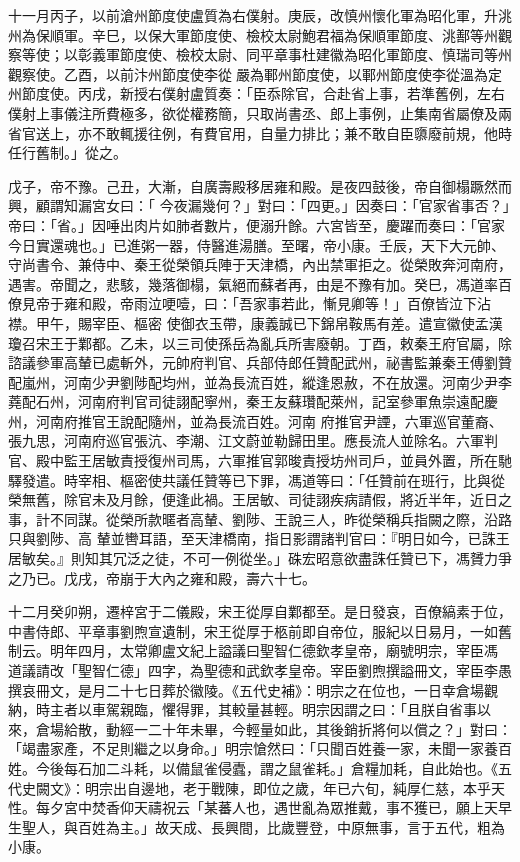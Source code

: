 \begin{pinyinscope}
 十一月丙子，以前滄州節度使盧質為右僕射。庚辰，改慎州懷化軍為昭化軍，升洮州為保順軍。辛巳，以保大軍節度使、檢校太尉鮑君福為保順軍節度、洮鄯等州觀察等使；以彰義軍節度使、檢校太尉、同平章事杜建徽為昭化軍節度、慎瑞司等州
 觀察使。乙酉，以前汴州節度使李從嚴為鄆州節度使，以鄆州節度使李從溫為定州節度使。丙戌，新授右僕射盧質奏：「臣忝除官，合赴省上事，若準舊例，左右僕射上事儀注所費極多，欲從權務簡，只取尚書丞、郎上事例，止集南省屬僚及兩省官送上，亦不敢輒援往例，有費官用，自量力排比；兼不敢自臣隳廢前規，他時任行舊制。」從之。



 戊子，帝不豫。己丑，大漸，自廣壽殿移居雍和殿。是夜四鼓後，帝自御榻蹶然而興，顧謂知漏宮女曰：「
 今夜漏幾何？」對曰：「四更。」因奏曰：「官家省事否？」帝曰：「省。」因唾出肉片如肺者數片，便溺升餘。六宮皆至，慶躍而奏曰：「官家今日實還魂也。」已進粥一器，侍醫進湯膳。至曙，帝小康。壬辰，天下大元帥、守尚書令、兼侍中、秦王從榮領兵陣于天津橋，內出禁軍拒之。從榮敗奔河南府，遇害。帝聞之，悲駭，幾落御榻，氣絕而蘇者再，由是不豫有加。癸巳，馮道率百僚見帝于雍和殿，帝雨泣哽噎，曰：「吾家事若此，慚見卿等！」百僚皆泣下沾襟。甲午，賜宰臣、樞密
 使御衣玉帶，康義誠已下錦帛鞍馬有差。遣宣徽使孟漢瓊召宋王于鄴都。乙未，以三司使孫岳為亂兵所害廢朝。丁酉，敕秦王府官屬，除諮議參軍高輦已處斬外，元帥府判官、兵部侍郎任贊配武州，祕書監兼秦王傅劉贊配嵐州，河南少尹劉陟配均州，並為長流百姓，縱逢恩赦，不在放還。河南少尹李蕘配石州，河南府判官司徒詡配寧州，秦王友蘇瓚配萊州，記室參軍魚崇遠配慶州，河南府推官王說配隨州，並為長流百姓。河南
 府推官尹諲，六軍巡官董裔、張九思，河南府巡官張沆、李潮、江文蔚並勒歸田里。應長流人並除名。六軍判官、殿中監王居敏責授復州司馬，六軍推官郭晙責授坊州司戶，並員外置，所在馳驛發遣。時宰相、樞密使共議任贊等已下罪，馮道等曰：「任贊前在班行，比與從榮無舊，除官未及月餘，便逢此禍。王居敏、司徒詡疾病請假，將近半年，近日之事，計不同謀。從榮所款暱者高輦、劉陟、王說三人，昨從榮稱兵指闕之際，沿路只與劉陟、高
 輦並轡耳語，至天津橋南，指日影謂諸判官曰：『明日如今，已誅王居敏矣。』則知其冗泛之徒，不可一例從坐。」硃宏昭意欲盡誅任贊已下，馮贇力爭之乃已。戊戌，帝崩于大內之雍和殿，壽六十七。



 十二月癸卯朔，遷梓宮于二儀殿，宋王從厚自鄴都至。是日發哀，百僚縞素于位，中書侍郎、平章事劉煦宣遺制，宋王從厚于柩前即自帝位，服紀以日易月，一如舊制云。明年四月，太常卿盧文紀上謚議曰聖智仁德欽孝皇帝，廟號明宗，宰臣馮
 道議請改「聖智仁德」四字，為聖德和武欽孝皇帝。宰臣劉煦撰謚冊文，宰臣李愚撰哀冊文，是月二十七日葬於徽陵。《五代史補》：明宗之在位也，一日幸倉場觀納，時主者以車駕親臨，懼得罪，其較量甚輕。明宗因謂之曰：「且朕自省事以來，倉場給散，動經一二十年未畢，今輕量如此，其後銷折將何以償之？」對曰：「竭盡家產，不足則繼之以身命。」明宗愴然曰：「只聞百姓養一家，未聞一家養百姓。今後每石加二斗耗，以備鼠雀侵蠹，謂之鼠雀耗。」倉糧加耗，自此始也。《五代史闕文》：明宗出自邊地，老于戰陳，即位之歲，年已六旬，純厚仁慈，本乎天性。每夕宮中焚香仰天禱祝云「某蕃人也，遇世亂為眾推戴，事不獲已，願上天早生聖人，與百姓為主。」故天成、長興間，比歲豐登，中原無事，言于五代，粗為小康。




\end{pinyinscope}
